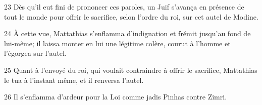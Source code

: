 
23 Dès qu’il eut fini de prononcer ces paroles, un Juif s’avança en présence de tout le monde pour offrir le sacrifice, selon l’ordre du roi, sur cet autel de Modine.

24 À cette vue, Mattathias s’enflamma d’indignation et frémit jusqu’au fond de lui-même; il laissa monter en lui une légitime colère, courut à l’homme et l’égorgea sur l’autel.

25 Quant à l’envoyé du roi, qui voulait contraindre à offrir le sacrifice, Mattathias le tua à l’instant même, et il renversa l’autel.

26 Il s’enflamma d’ardeur pour la Loi comme jadis Pinhas contre Zimri.
